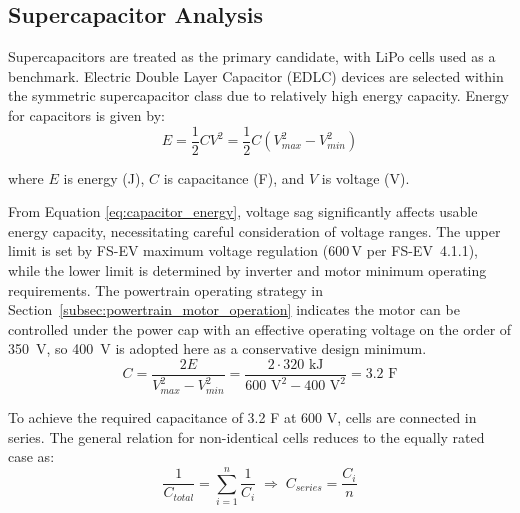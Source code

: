 \documentclass[11pt, a4paper]{report}
\numberwithin{equation}{section}
\begin{document}
\begin{refsection}
\subsection{Supercapacitor Analysis}
\label{subsec:supercapacitor_analysis}

Supercapacitors are treated as the primary candidate, with LiPo cells used as a benchmark. Electric Double Layer Capacitor (EDLC) devices are selected within the symmetric supercapacitor class due to relatively high energy capacity. Energy for capacitors is given by:
\begingroup
\setlength{\abovedisplayskip}{8pt plus 0pt minus 0pt}
\setlength{\belowdisplayskip}{8pt plus 0pt minus 0pt}
\setlength{\abovedisplayshortskip}{8pt plus 0pt minus 0pt}
\setlength{\belowdisplayshortskip}{8pt plus 0pt minus 0pt}
\begin{equation}
E=\frac{1}{2}CV^2 = \frac{1}{2} C (V_{max}^2-V_{min}^2)
\label{eq:capacitor_energy}
\end{equation}
\endgroup

where $E$ is energy (J), $C$ is capacitance (F), and $V$ is voltage (V).

From Equation \eqref{eq:capacitor_energy}, voltage sag significantly affects usable energy capacity, necessitating careful consideration of voltage ranges. The upper limit is set by FS-EV maximum voltage regulation (600\,V per FS-EV~4.1.1), while the lower limit is determined by inverter and motor minimum operating requirements. The powertrain operating strategy in Section~\ref{subsec:powertrain_motor_operation} indicates the motor can be controlled under the power cap with an effective operating voltage on the order of \SI{350}{\volt}, so \SI{400}{\volt} is adopted here as a conservative design minimum.
\begingroup
\setlength{\abovedisplayskip}{8pt plus 0pt minus 0pt}
\setlength{\belowdisplayskip}{8pt plus 0pt minus 0pt}
\setlength{\abovedisplayshortskip}{8pt plus 0pt minus 0pt}
\setlength{\belowdisplayshortskip}{8pt plus 0pt minus 0pt}
\begin{equation}
C=\frac{2 E}{V_{max}^2-V_{min}^2}=\frac{2 \cdot 320\text{ kJ}}{600\text{ V}^2-400\text{ V}^2}=3.2\text{ F}
\label{eq:required_capacitance}
\end{equation}
\endgroup

To achieve the required capacitance of 3.2 F at 600 V, cells are connected in series. The general relation for non-identical cells reduces to the equally rated case as:
\begingroup
\setlength{\abovedisplayskip}{8pt plus 0pt minus 0pt}
\setlength{\belowdisplayskip}{8pt plus 0pt minus 0pt}
\setlength{\abovedisplayshortskip}{8pt plus 0pt minus 0pt}
\setlength{\belowdisplayshortskip}{8pt plus 0pt minus 0pt}
\begin{equation}
\frac{1}{C_{total}} = \sum_{i=1}^{n} \frac{1}{C_{i}}\;\Rightarrow\;C_{series}=\frac{C_{i}}{n}
\label{eq:series_capacitance}
\end{equation}
\endgroup


\end{refsection}
\end{document}
